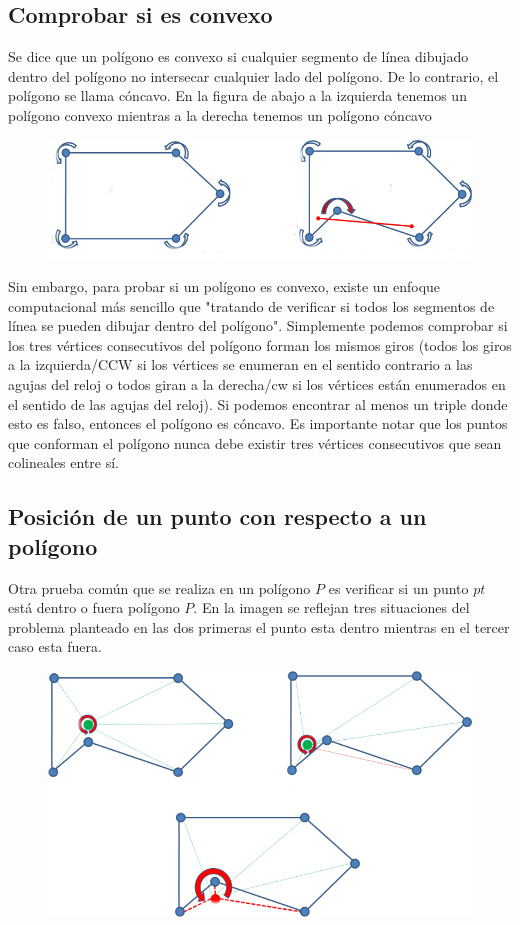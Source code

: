 \subsection{Comprobar si es convexo}

Se dice que un polígono es convexo si cualquier segmento de línea dibujado dentro del polígono no
intersecar cualquier lado del polígono. De lo contrario, el polígono se llama cóncavo. En la figura de abajo a la izquierda tenemos un polígono convexo mientras a la derecha tenemos un polígono cóncavo

\begin{figure}[h!]
	\centering
	\includegraphics[width=0.7\linewidth]{img/poligono_convexo_concavo}
	\caption{}
	\label{fig:poligonoconvexoconcavo}
\end{figure}

Sin embargo, para probar si un polígono es convexo, existe un enfoque computacional más sencillo que
"tratando de verificar si todos los segmentos de línea se pueden dibujar dentro del polígono". Simplemente podemos comprobar si los tres vértices consecutivos del polígono forman los mismos giros (todos los giros a la izquierda/CCW si los vértices se enumeran en el sentido contrario a las agujas del reloj o todos giran a la derecha/cw si los vértices están enumerados en el sentido de las agujas del reloj). Si podemos encontrar al menos un triple donde esto es falso, entonces el polígono es cóncavo. Es importante notar que los puntos que conforman el polígono nunca debe existir tres vértices consecutivos que sean colineales entre sí.


\subsection{Posición de un punto con respecto a un polígono}

Otra prueba común que se realiza en un polígono $P$ es verificar si un punto $pt$ está dentro o fuera
polígono $P$. En la imagen se reflejan tres situaciones del problema planteado en las dos primeras el punto esta dentro mientras en el tercer caso esta fuera.

\begin{figure}[h!]
	\centering
	\includegraphics[width=0.6\linewidth]{img/poligono_convexo_punto}
	\label{fig:poligonoconvexopunto}
\end{figure}



